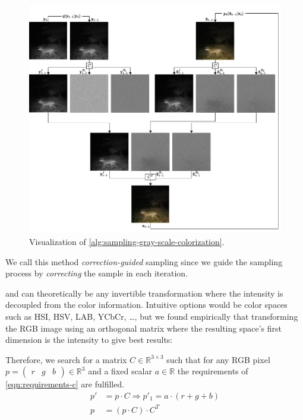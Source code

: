 \begin{figure}
   \includegraphics[width=\textwidth]{gfx/Gray-Scale-Colorization-Sampling.pdf}
   \caption{Visualization of \autoref{alg:sampling-gray-scale-colorization}.}
   \label{fig:sampling-gray-scale-colorization}
\end{figure}

We call this method \textit{correction-guided} sampling since we guide the sampling process by \textit{correcting} the sample in each iteration.

 and  can theoretically be any invertible transformation where the intensity is decoupled from the color information.
Intuitive options would be color spaces such as HSI, HSV, LAB, YCbCr, \dots,
but we found empirically that transforming the RGB image using an orthogonal matrix where the resulting space's first dimension is the intensity to give best results:

Therefore, we search for a matrix $C \in \mathbb{R}^{3\times3}$ such that for any RGB pixel $p = \begin{pmatrix}r & g &b\end{pmatrix} \in \mathbb{R}^3$ and a fixed scalar $a \in \mathbb{R}$ the requirements of \autoref{eqn:requirements-c} are fulfilled.
\begin{equation}
   \label{eqn:requirements-c}
   \begin{aligned}
      p' & = p \cdot C \Rightarrow p'_1 = a \cdot (r + g + b) \\
      p  & = (p \cdot C) \cdot C^T
   \end{aligned}
\end{equation}


